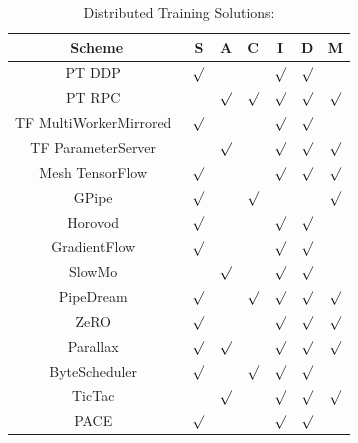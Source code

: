 \begin{center}
\begin{table}
\begin{center}
\begin{tabular}{ |c|cccccc| }
\hline
Scheme & S & A & C & I & D & M\\
\hline
PT DDP~\cite{pt-ddp} & $\surd$ & & & $\surd$ & $\surd$ & \\
\hline
PT RPC~\cite{rpc} &  & $\surd$  & $\surd$ & $\surd$  & $\surd$  & $\surd$ \\
\hline
TF MultiWorkerMirrored~\cite{tf-ddp} & $\surd$ & & & $\surd$ & $\surd$ & \\
\hline
TF ParameterServer~\cite{tf-ps, ps} & & $\surd$  & & $\surd$ & $\surd$ & $\surd$ \\
\hline
Mesh TensorFlow~\cite{shazeer2018mesh} & $\surd$ &  & & $\surd$ & $\surd$ & $\surd$ \\
\hline
GPipe~\cite{gpipe} & $\surd$ &  & $\surd$ &  & & $\surd$ \\
\hline
Horovod~\cite{sergeev2018horovod} & $\surd$ & & & $\surd$ & $\surd$ & \\
\hline
GradientFlow~\cite{sun2019gradientflow} & $\surd$ & & & $\surd$ & $\surd$ & \\
\hline
SlowMo~\cite{wang2019slowmo} & & $\surd$  & & $\surd$ & $\surd$ & \\
\hline
PipeDream~\cite{narayanan2019pipedream} & $\surd$ &  & $\surd$ & $\surd$  & $\surd$  & $\surd$ \\
\hline
ZeRO~\cite{rajbhandari2019zero} & $\surd$ &  & & $\surd$  & $\surd$  & $\surd$ \\
\hline
Parallax~\cite{parallax} & $\surd$ & $\surd$ & & $\surd$  & $\surd$  & $\surd$ \\
\hline
ByteScheduler~\cite{bytescheduler} & $\surd$ & & $\surd$  & $\surd$  & $\surd$  & \\
\hline
TicTac~\cite{hashemi2018tictac} & & $\surd$ & & $\surd$  & $\surd$  & $\surd$  \\
\hline
PACE~\cite{baopreemptive}  & $\surd$ &  & & $\surd$  & $\surd$  &   \\
\hline
\end{tabular}
\end{center}
\caption{Distributed Training Solutions: \vspace{-1em}}\label{tab:related}
\end{table}
\end{center}


